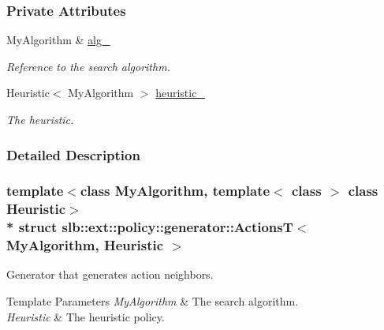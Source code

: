 \subsubsection*{Private Attributes}
\begin{DoxyCompactItemize}
\item 
My\+Algorithm \& \hyperlink{structslb_1_1ext_1_1policy_1_1generator_1_1ActionsT_ac7ba713fd6922437044de0ac81c3df6b}{alg\+\_\+}\hypertarget{structslb_1_1ext_1_1policy_1_1generator_1_1ActionsT_ac7ba713fd6922437044de0ac81c3df6b}{}\label{structslb_1_1ext_1_1policy_1_1generator_1_1ActionsT_ac7ba713fd6922437044de0ac81c3df6b}

\begin{DoxyCompactList}\small\item\em Reference to the search algorithm. \end{DoxyCompactList}\item 
Heuristic$<$ My\+Algorithm $>$ \hyperlink{structslb_1_1ext_1_1policy_1_1generator_1_1ActionsT_a9f44dbf470dd772315d21c4a94d22167}{heuristic\+\_\+}\hypertarget{structslb_1_1ext_1_1policy_1_1generator_1_1ActionsT_a9f44dbf470dd772315d21c4a94d22167}{}\label{structslb_1_1ext_1_1policy_1_1generator_1_1ActionsT_a9f44dbf470dd772315d21c4a94d22167}

\begin{DoxyCompactList}\small\item\em The heuristic. \end{DoxyCompactList}\end{DoxyCompactItemize}


\subsubsection{Detailed Description}
\subsubsection*{template$<$class My\+Algorithm, template$<$ class $>$ class Heuristic$>$\\*
struct slb\+::ext\+::policy\+::generator\+::\+Actions\+T$<$ My\+Algorithm, Heuristic $>$}

Generator that generates action neighbors. 


\begin{DoxyTemplParams}{Template Parameters}
{\em My\+Algorithm} & The search algorithm. \\
\hline
{\em Heuristic} & The heuristic policy. \\
\hline
\end{DoxyTemplParams}


